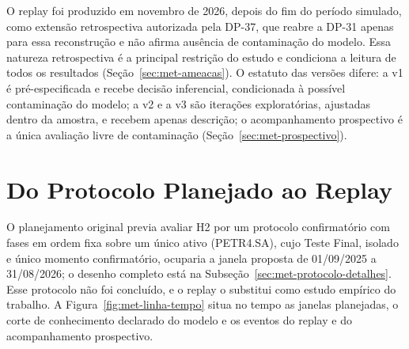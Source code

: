 O replay foi produzido em novembro de 2026, depois do fim do período simulado, como extensão retrospectiva autorizada pela \mbox{DP-37}, que reabre a \mbox{DP-31} apenas para essa reconstrução e não afirma ausência de contaminação do modelo. Essa natureza retrospectiva é a principal restrição do estudo e condiciona a leitura de todos os resultados (Seção~\ref{sec:met-ameacas}). O estatuto das versões difere: a v1 é pré-especificada e recebe decisão inferencial, condicionada à possível contaminação do modelo; a v2 e a v3 são iterações exploratórias, ajustadas dentro da amostra, e recebem apenas descrição; o acompanhamento prospectivo é a única avaliação livre de contaminação (Seção~\ref{sec:met-prospectivo}).

\section{Do Protocolo Planejado ao Replay}
\label{sec:met-protocolo}

O planejamento original previa avaliar H2 por um protocolo confirmatório com fases em ordem fixa sobre um único ativo (PETR4.SA), cujo Teste Final, isolado e único momento confirmatório, ocuparia a janela proposta de 01/09/2025 a 31/08/2026; o desenho completo está na Subseção~\ref{sec:met-protocolo-detalhes}. Esse protocolo não foi concluído, e o replay o substitui como estudo empírico do trabalho. A Figura~\ref{fig:met-linha-tempo} situa no tempo as janelas planejadas, o corte de conhecimento declarado do modelo e os eventos do replay e do acompanhamento prospectivo.

